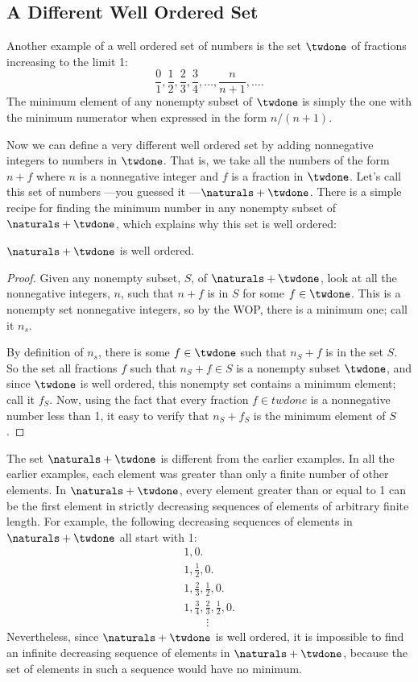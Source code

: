 \subsection{A Different Well Ordered Set}
\begin{optional}
Another example of a well ordered set of numbers is the set $\twdone$ of
fractions increasing to the limit 1:
\[
\frac01, \frac12, \frac23, \frac34, \dots, \frac{n}{n+1}, \dots.
\]
The minimum element of any nonempty subset of $\twdone$ is simply the one
with the minimum numerator when expressed in the form $n/(n+1)$. 

Now we can define a very different well ordered set by adding
nonnegative integers to numbers in $\twdone$.  That is, we take all
the numbers of the form $n + f$ where $n$ is a nonnegative integer and
$f$ is a fraction in $\twdone$.  Let's call this set of numbers ---you
guessed it ---$\naturals + \twdone$.  There is a simple recipe for
finding the minimum number in any nonempty subset of $\naturals +
\twdone$, which explains why this set is well ordered:

\begin{lemma}\label{to1_well-order}
$\naturals + \twdone$ is well ordered.
\end{lemma}

\begin{proof}
Given any nonempty subset, $S$, of $\naturals + \twdone$, look at all
the nonnegative integers, $n$, such that $n+f$ is in $S$ for some $f
\in \twdone$.  This is a nonempty set nonnegative integers, so by the
WOP, there is a minimum one; call it $n_s$.

By definition of $n_s$, there is some $f \in \twdone$ such that
$n_S+f$ is in the set $S$.  So the set all fractions $f$ such that
$n_S+f \in S$ is a nonempty subset $\twdone$, and since $\twdone$ is
well ordered, this nonempty set contains a minimum element; call it
$f_S$.  Now, using the fact that every fraction $f \in twdone$ is a
nonnegative number less than 1, it easy to verify that $n_S+f_S$ is
the minimum element of $S$.
\end{proof}

The set $\naturals + \twdone$ is different from the earlier examples.
In all the earlier examples, each element was greater than
only a finite number of other elements.  In $\naturals + \twdone$, every
element greater than or equal to 1 can be the first element in
strictly decreasing sequences of elements of arbitrary finite length.
For example, the following decreasing sequences of elements in
$\naturals + \twdone$ all start with 1:
\[\begin{array}{l}
1, 0.\\
1, \frac12, 0.\\
1, \frac23, \frac12, 0.\\
1,  \frac34, \frac23, \frac12, 0.\\
\qquad\vdots
\end{array}\]
Nevertheless, since $\naturals + \twdone$ is well ordered, it is
impossible to find an infinite decreasing sequence of elements in
$\naturals + \twdone$, because the set of elements in such a sequence
would have no minimum.

\end{optional}

